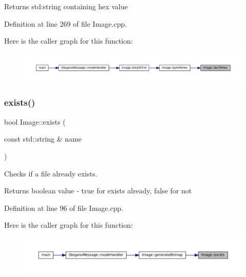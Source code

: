 \begin{DoxyReturn}{Returns}
std\+:string containing hex value 
\end{DoxyReturn}


Definition at line 269 of file Image.\+cpp.

Here is the caller graph for this function\+:\nopagebreak
\begin{figure}[H]
\begin{center}
\leavevmode
\includegraphics[width=350pt]{classImage_a26f7e0b2649e2529df7e7aea46f2da4a_icgraph}
\end{center}
\end{figure}
\mbox{\label{classImage_a83d7183bfcd632649c36504d9ab07e36}} 
\subsubsection{\texorpdfstring{exists()}{exists()}}
{\footnotesize\ttfamily bool Image\+::exists (\begin{DoxyParamCaption}\item[{const std\+::string \&}]{name }\end{DoxyParamCaption})\hspace{0.3cm}{\ttfamily [private]}}



Checks if a file already exists. 

\begin{DoxyReturn}{Returns}
boolean value -\/ true for exists already, false for not 
\end{DoxyReturn}


Definition at line 96 of file Image.\+cpp.

Here is the caller graph for this function\+:
\nopagebreak
\begin{figure}[H]
\begin{center}
\leavevmode
\includegraphics[width=350pt]{classImage_a83d7183bfcd632649c36504d9ab07e36_icgraph}
\end{center}
\end{figure}
\mbox{\label{classImage_a3ca1ae6c1eb2846bfba066b01e6020e1}} 
